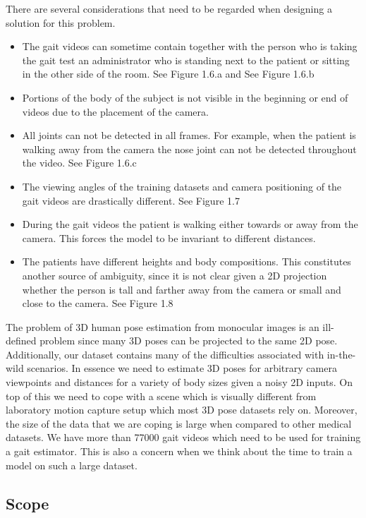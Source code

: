 There are several considerations that need to be regarded when designing a solution for this problem. 
\begin{itemize}
    \item The gait videos can sometime contain together with the person who is taking the gait test an administrator who is standing next to the patient or sitting in the other side of the room. See Figure 1.6.a and See Figure 1.6.b
    \item Portions of the body of the subject is not visible in the beginning or end of videos due to the placement of the camera.
    \item All joints can not be detected in all frames. For example, when the patient is walking away from the camera the nose joint can not be detected throughout the video. See Figure 1.6.c
    \item The viewing angles of the training datasets and camera positioning of the gait videos are drastically different. See Figure 1.7
    \item During the gait videos the patient is walking either towards or away from the camera. This forces the model to be invariant to different distances.
    \item The patients have different heights and body compositions. This constitutes another source of ambiguity, since it is not clear given a 2D projection whether the person is tall and farther away from the camera or small and close to the camera. See Figure 1.8
\end{itemize}

The problem of 3D human pose estimation from monocular images is an ill-defined problem since many 3D poses can be projected to the same 2D pose. Additionally, our dataset contains many of the difficulties associated with in-the-wild scenarios. In essence we need to estimate 3D poses for arbitrary camera viewpoints and distances for a variety of body sizes given a noisy 2D inputs. On top of this we need to cope with a scene which is visually different from laboratory motion capture setup which most 3D pose datasets rely on. Moreover, the size of the data that we are coping is large when compared to other medical datasets. We have more than 77000 gait videos which need to be used for training a gait estimator. This is also a concern when we think about the time to train a model on such a large dataset.

\subsection{Scope}


